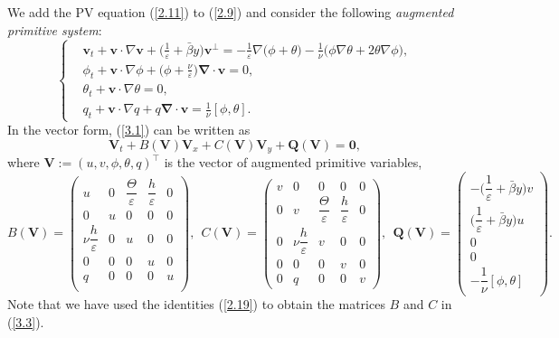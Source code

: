 \documentclass[a4paper,11pt,twoside]{article}
\numberwithin{equation}{section}
\numberwithin{figure}{section}
\numberwithin{table}{section}
\newcommand{\bnabla}{\bm{\nabla}}
\newcommand{\eps}{\varepsilon}
\newcommand{\bv}{\bm{v}}
\newcommand{\bV}{\bm{V}}
\newcommand{\bQ}{\bm{Q}}
\newcommand\eref[1]{(\ref{#1})}
\begin{document}
We add the PV equation \eref{2.11} to \eref{2.9} and consider the following \emph{augmented primitive system}:
\begin{equation}
\left\{\begin{aligned}
&\bv_t+\bv\cdot\nabla\bv+\bigg(\frac{1}{\eps}+\bar\beta y\bigg)\bv^\perp=-\frac{1}{\eps}\nabla\big(\phi+\theta\big)-
\frac{1}{\nu}\big(\phi\nabla\theta+2\theta\nabla\phi\big),\\
&\phi_t+\bv\cdot\nabla\phi+\Big(\phi+\frac{\nu}{\eps}\Big)\bnabla\!\cdot\!\bv=0,\\
&\theta_t+\bv\cdot\nabla\theta=0,\\
&q_t+\bv\cdot\nabla q+q\bnabla\!\cdot\!\bv=\frac{1}{\nu}[\phi,\theta].
\end{aligned}\right.
\label{3.1}
\end{equation}
In the vector form, \eref{3.1} can be written as
\begin{equation}
\bV_t+B(\bV)\bV_x+C(\bV)\bV_y+\bQ(\bV)=\bm0,
\label{3.2}
\end{equation}
where $\bV:=(u,v,\phi,\theta,q)^\top$ is the vector of augmented primitive variables, 
\begin{equation}
B(\bV)=\begin{pmatrix}
u&0&\dfrac{\Theta}{\eps}&\dfrac{h}{\eps}&0\\0&u&0&0&0\\\nu\dfrac{h}{\eps}&0&u&0&0\\0&0&0&u&0\\q&0&0&0&u\\
\end{pmatrix}\!,~~
C(\bV)=\begin{pmatrix}
v&0&0&0&0\\0&v&\dfrac{\Theta}{\eps}&\dfrac{h}{\eps}&0\\0&\nu\dfrac{h}{\eps}&v&0&0\\0&0&0&v&0\\0&q&0&0&v
\end{pmatrix}\!,~~
\bQ(\bV)=\begin{pmatrix}
-\Big(\dfrac{1}{\eps}+\bar{\beta}y\Big)v\\[1.5ex]\Big(\dfrac{1}{\eps}+\bar{\beta}y\Big)u\\0\\0\\-\dfrac{1}{\nu}[\phi,\theta]
\end{pmatrix}.
\label{3.3}
\end{equation}
Note that we have used the identities \eref{2.19} to obtain the matrices $B$ and $C$ in \eref{3.3}.
\end{document}
